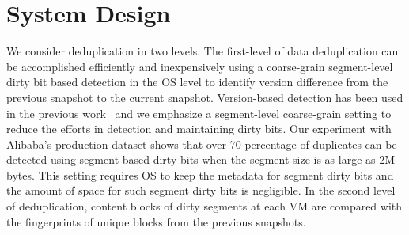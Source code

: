 \section{System Design}
\label{sect:arch}




We consider deduplication in two levels. The first-level of data deduplication can be accomplished efficiently and 
inexpensively using a coarse-grain segment-level  dirty bit based detection in the OS level  to 
identify version difference from the previous snapshot to the current snapshot.  
Version-based detection has been used in the previous work~\cite{Clements2009,cumulus09,TanIPDPS2011} and
we emphasize a segment-level coarse-grain setting to reduce the efforts in detection and maintaining dirty bits. 
Our experiment with Alibaba's production dataset shows that over 70 percentage of 
duplicates can be detected using segment-based dirty bits when the segment size is as large as 2M bytes.  
This setting requires OS to keep the metadata for segment dirty bits and the amount of space for such segment 
dirty bits is negligible. In the second level of deduplication, content blocks of dirty segments at each VM 
are compared with the fingerprints of unique  blocks from the previous snapshots.

